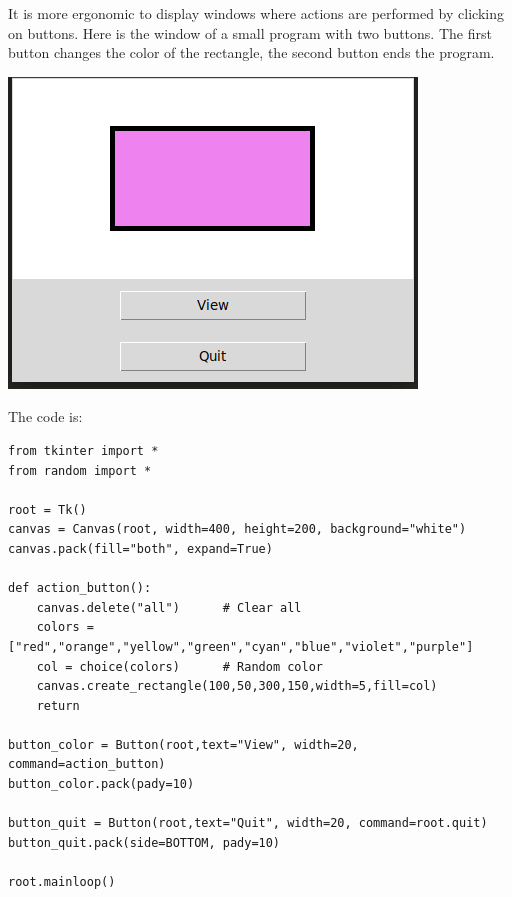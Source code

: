 \documentclass[11pt,class=report,crop=false]{standalone}
\begin{document}
It is more ergonomic to display windows where actions are performed by clicking on buttons.
Here is the window of a small program with two buttons. The first button changes the color of the rectangle, the second button ends the program.
\begin{center}
\includegraphics[scale=\myscale,scale=0.6]{../statistics/screen-stat-lesson-buttons-en}
\end{center}

The code is:
\begin{lstlisting}
from tkinter import *
from random import *

root = Tk()     
canvas = Canvas(root, width=400, height=200, background="white")
canvas.pack(fill="both", expand=True)

def action_button():
    canvas.delete("all")      # Clear all
    colors = ["red","orange","yellow","green","cyan","blue","violet","purple"]
    col = choice(colors)      # Random color
    canvas.create_rectangle(100,50,300,150,width=5,fill=col)
    return

button_color = Button(root,text="View", width=20, command=action_button)
button_color.pack(pady=10)

button_quit = Button(root,text="Quit", width=20, command=root.quit)
button_quit.pack(side=BOTTOM, pady=10)

root.mainloop()
\end{lstlisting}
\end{document}
